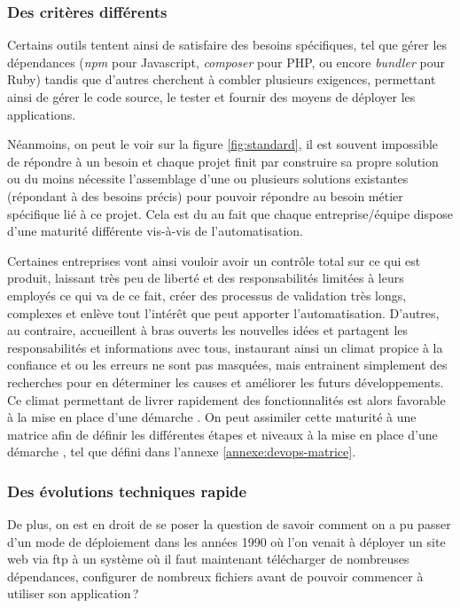 \subsubsection{Des critères différents}

Certains outils tentent ainsi de satisfaire des besoins spécifiques, tel que gérer les dépendances (\emph{npm} pour Javascript, \emph{composer} pour \gls{PHP}, ou encore \emph{bundler} pour Ruby) tandis que d'autres cherchent à combler plusieurs exigences, permettant ainsi de gérer le code source, le tester et fournir des moyens de déployer les applications.


Néanmoins, on peut le voir sur la figure \ref{fig:standard}, il est souvent impossible de répondre à un besoin  et chaque projet finit par construire sa propre solution ou du moins nécessite l'assemblage d'une ou plusieurs solutions existantes (répondant à des besoins précis) pour pouvoir répondre au besoin métier spécifique lié à ce projet. Cela est du au fait que chaque entreprise/équipe dispose d'une maturité différente vis-à-vis de l'automatisation.

Certaines entreprises vont ainsi vouloir avoir un contrôle total sur ce qui est produit, laissant très peu de liberté et des responsabilités limitées à leurs employés ce qui va de ce fait, créer des processus de validation très longs, complexes et enlève tout l'intérêt que peut apporter l'automatisation. D'autres, au contraire, accueillent à bras ouverts les nouvelles idées et partagent les responsabilités et informations avec tous, instaurant ainsi un climat propice à la confiance et ou les erreurs ne sont pas masquées, mais entrainent simplement des recherches pour en déterminer les causes et améliorer les futurs développements. Ce climat permettant de livrer rapidement des fonctionnalités est alors favorable à la mise en place d'une démarche \devops. On peut assimiler cette maturité à une matrice afin de définir les différentes étapes et niveaux à la mise en place d'une démarche \devops, tel que défini dans l'annexe \ref{annexe:devops-matrice}.

\subsubsection{Des évolutions techniques rapide}

De plus, on est en droit de se poser la question de savoir comment on a pu passer d'un mode de déploiement dans les années 1990 où l'on venait à déployer un site web via \gls{ftp} à un système où il faut maintenant télécharger de nombreuses dépendances, configurer de nombreux fichiers avant de pouvoir commencer à utiliser son application ?


